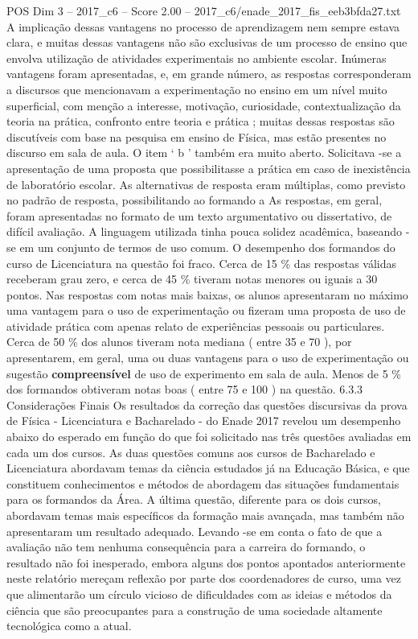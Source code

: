 \begin{textsample}{POS Dim 3 – 2017\_c6 – Score 2.00 – 2017\_c6/enade\_2017\_fis\_eeb3bfda27.txt}
A implicação dessas vantagens no processo de aprendizagem nem sempre estava clara, e muitas dessas vantagens não são exclusivas de um processo de ensino que envolva utilização de atividades experimentais no ambiente escolar.
Inúmeras vantagens foram apresentadas, e, em grande número, as respostas corresponderam a discursos que mencionavam a experimentação no ensino em um nível muito superficial, com menção a interesse, motivação, curiosidade, contextualização da teoria na prática, confronto entre teoria e prática ; muitas dessas respostas são discutíveis com base na pesquisa em ensino de Física, mas estão presentes no discurso em sala de aula.
O item ‘ b ’ também era muito aberto.
Solicitava -se a apresentação de uma proposta que possibilitasse a prática em caso de inexistência de laboratório escolar.
As alternativas de resposta eram múltiplas, como previsto no padrão de resposta, possibilitando ao formando a As respostas, em geral, foram apresentadas no formato de um texto argumentativo ou dissertativo, de difícil avaliação.
A linguagem utilizada tinha pouca solidez acadêmica, baseando -se em um conjunto de termos de uso comum.
O desempenho dos formandos do curso de Licenciatura na questão foi fraco.
Cerca de 15 \% das respostas válidas receberam grau zero, e cerca de 45 \% tiveram notas menores ou iguais a 30 pontos.
Nas respostas com notas mais baixas, os alunos apresentaram no máximo uma vantagem para o uso de experimentação ou fizeram uma proposta de uso de atividade prática com apenas relato de experiências pessoais ou particulares.
Cerca de 50 \% dos alunos tiveram nota mediana ( entre 35 e 70 ), por apresentarem, em geral, uma ou duas vantagens para o uso de experimentação ou sugestão \textbf{compreensível} de uso de experimento em sala de aula.
Menos de 5 \% dos formandos obtiveram notas boas ( entre 75 e 100 ) na questão. 6.3.3 Considerações Finais Os resultados da correção das questões discursivas da prova de Física - Licenciatura e Bacharelado - do Enade 2017 revelou um desempenho abaixo do esperado em função do que foi solicitado nas três questões avaliadas em cada um dos cursos.
As duas questões comuns aos cursos de Bacharelado e Licenciatura abordavam temas da ciência estudados já na Educação Básica, e que constituem conhecimentos e métodos de abordagem das situações fundamentais para os formandos da Área.
A última questão, diferente para os dois cursos, abordavam temas mais específicos da formação mais avançada, mas também não apresentaram um resultado adequado.
Levando -se em conta o fato de que a avaliação não tem nenhuma consequência para a carreira do formando, o resultado não foi inesperado, embora alguns dos pontos apontados anteriormente neste relatório mereçam reflexão por parte dos coordenadores de curso, uma vez que alimentarão um círculo vicioso de dificuldades com as ideias e métodos da ciência que são preocupantes para a construção de uma sociedade altamente tecnológica como a atual.

\end{textsample}
